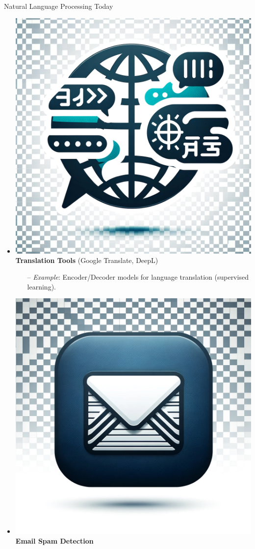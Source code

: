 \documentclass{beamer}
\newenvironment{stepitemize}{\begin{itemize}[<+->]}{\end{itemize} }
\begin{document}
\begin{frame}{Natural Language Processing Today}
\begin{stepitemize}
\begin{itemize}
\item[--] \textit{Example}: Predictive text and autocorrect (language modeling, supervised learning).
\end{itemize}
\item \includegraphics[scale=0.015]{figures/translation_tool_icon.png} \textbf{Translation Tools} (Google Translate, DeepL)
\begin{itemize}
\item[--] \textit{Example}: Encoder/Decoder models for language translation (supervised learning).
\end{itemize}
\item \includegraphics[scale=0.015]{figures/email_icon.png} \textbf{Email Spam Detection}

\end{stepitemize}
\end{frame}
\end{document}
